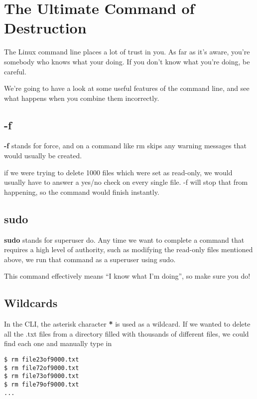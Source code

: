 \section{The Ultimate Command of Destruction}

	The Linux command line places a lot of trust in you. As far as it's aware, you're somebody who knows what your doing. If you don't know what you're doing, be careful.
	
	We're going to have a look at some useful features of the command line, and see what happens when you combine them incorrectly.
		
	\subsection*{-f}
	
		\textbf{-f} stands for force, and on a command like rm skips any warning messages that would usually be created.
		
		if we were trying to delete 1000 files which were set as read-only, we would usually have to answer a yes/no check on every single file. -f will stop that from happening, so the command would finish instantly.
	
	\subsection*{sudo}
	
		\textbf{sudo} stands for superuser do. Any time we want to complete a command that requires a high level of authority, such as modifying the read-only files mentioned above, we run that command as a superuser using sudo.
		
		This command effectively means ``I know what I'm doing'', so make sure you do!
	
	\subsection*{Wildcards}
	
		In the CLI, the asterisk character \textbf{*} is used as a wildcard. If we wanted to delete all the .txt files from a directory filled with thousands of different files, we could find each one and manually type in
	
\begin{lstlisting}
$ rm file23of9000.txt
$ rm file72of9000.txt
$ rm file73of9000.txt
$ rm file79of9000.txt
...
\end{lstlisting}

